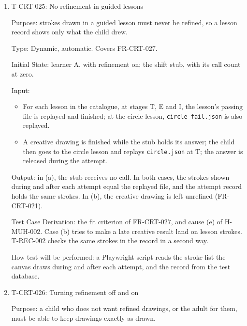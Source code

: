 \documentclass[12pt, titlepage]{article}
\newcommand{\testitem}[1]{\item #1\par\nopagebreak}
\begin{document}
\begin{enumerate}
Test Case Derivation: the fit criteria of FR-CRT-021 ((a) and (c)) and
FR-CRT-022 ((b)), and cause (b) of H-MUH-002. Undoing (d) is also a change,
and (e) checks that a result never reaches another drawing. Case (f) shows
that the stub's held answer is applied when nothing has changed, so in the
other cases a result that was discarded can be told apart from one that
never came.

How test will be performed: a Playwright script makes the changes, releases
the stub, and compares the drawing with the expected one.

\testitem{T-CRT-025: No refinement in guided lessons}

Purpose: strokes drawn in a guided lesson must never be refined, so a lesson
record shows only what the child drew.

Type: Dynamic, automatic. Covers FR-CRT-027.

Initial State: learner A, with refinement on; the shift stub, with its call
count at zero.

Input:
\begin{itemize}
\item[(a)] For each lesson in the catalogue, at stages T, E and I, the
lesson's passing file is replayed and finished; at the circle lesson,
\texttt{circle-\allowbreak{}fail.json} is also replayed.
\item[(b)] A creative drawing is finished while the stub holds its answer;
the child then goes to the circle lesson and replays \texttt{circle.json} at
T; the answer is released during the attempt.
\end{itemize}

Output: in (a), the stub receives no call. In both cases, the strokes shown
during and after each attempt equal the replayed file, and the attempt
record holds the same strokes. In (b), the creative drawing is left
unrefined (FR-CRT-021).

Test Case Derivation: the fit criterion of FR-CRT-027, and cause (e) of
H-MUH-002. Case (b) tries to make a late creative result land on lesson
strokes. T-REC-002 checks the same strokes in the record in a second way.

How test will be performed: a Playwright script reads the stroke list the
canvas draws during and after each attempt, and the record from the test
database.

\testitem{T-CRT-026: Turning refinement off and on}

Purpose: a child who does not want refined drawings, or the adult for them,
must be able to keep drawings exactly as drawn.


\end{enumerate}
\end{document}
